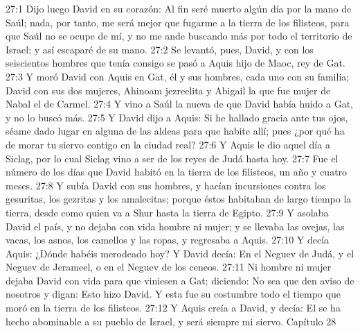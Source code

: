 27:1 Dijo luego David en su corazón: Al fin seré muerto algún día por la mano de Saúl; nada, por tanto, me será mejor que fugarme a la tierra de los filisteos, para que Saúl no se ocupe de mí, y no me ande buscando más por todo el territorio de Israel; y así escaparé de su mano.  
27:2 Se levantó, pues, David, y con los seiscientos hombres que tenía consigo se pasó a Aquis hijo de Maoc, rey de Gat.  
27:3 Y moró David con Aquis en Gat, él y sus hombres, cada uno con su familia; David con sus dos mujeres, Ahinoam jezreelita y Abigail la que fue mujer de Nabal el de Carmel.  
27:4 Y vino a Saúl la nueva de que David había huido a Gat, y no lo buscó más.  
27:5 Y David dijo a Aquis: Si he hallado gracia ante tus ojos, séame dado lugar en alguna de las aldeas para que habite allí; pues ¿por qué ha de morar tu siervo contigo en la ciudad real?  
27:6 Y Aquis le dio aquel día a Siclag, por lo cual Siclag vino a ser de los reyes de Judá hasta hoy.  
27:7 Fue el número de los días que David habitó en la tierra de los filisteos, un año y cuatro meses.  
27:8 Y subía David con sus hombres, y hacían incursiones contra los gesuritas, los gezritas y los amalecitas; porque éstos habitaban de largo tiempo la tierra, desde como quien va a Shur hasta la tierra de Egipto.  
27:9 Y asolaba David el país, y no dejaba con vida hombre ni mujer; y se llevaba las ovejas, las vacas, los asnos, los camellos y las ropas, y regresaba a Aquis.  
27:10 Y decía Aquis: ¿Dónde habéis merodeado hoy? Y David decía: En el Neguev de Judá, y el Neguev de Jerameel, o en el Neguev de los ceneos.  
27:11 Ni hombre ni mujer dejaba David con vida para que viniesen a Gat; diciendo: No sea que den aviso de nosotros y digan: Esto hizo David. Y esta fue su costumbre todo el tiempo que moró en la tierra de los filisteos.  
27:12 Y Aquis creía a David, y decía: El se ha hecho abominable a su pueblo de Israel, y será siempre mi siervo.  
Capítulo 28

